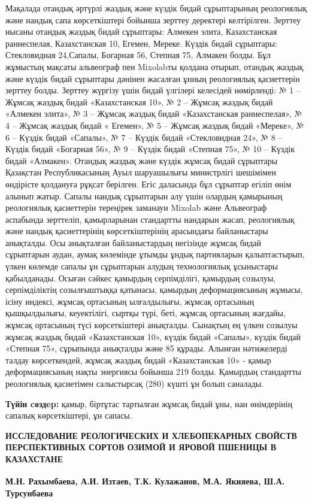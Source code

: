 Мақалада отандық әртүрлі жаздық және күздік бидай сұрыптарының
реологиялық және нандық сапа көрсеткіштері бойынша зерттеу деректері
келтірілген. Зерттеу нысаны отандық жаздық бидай сұрыптары: Алмекен
элита, Казахстанская раннеспелая, Казахстанская 10, Егемен, Мереке.
Күздік бидай сұрыптары: Стекловидная 24,Сапалы, Богарная 56, Степная 75,
Алмакен болды. Бұл жұмыстың мақсаты альвеограф пен Mixolabты қолдана
отырып, отандық жаздық және күздік бидай сұрыптары дәнінен жасалған
ұнның реологиялық қасиеттерін зерттеу болды. Зерттеу жүргізу үшін бидай
үлгілері келесідей нөмірленді: № 1 -- Жұмсақ жаздық бидай «Казахстанская
10», № 2 -- Жұмсақ жаздық бидай «Алмекен элита», № 3 -- Жұмсақ жаздық
бидай «Казахстанская раннеспелая», № 4 -- Жұмсақ жаздық бидай « Егемен»,
№ 5 -- Жұмсақ жаздық бидай «Мереке», № 6 -- Күздік бидай «Сапалы», № 7
-- Күздік бидай «Стекловидная 24», № 8 -- Күздік бидай «Богарная 56», №
9 -- Күздік бидай «Степная 75», № 10 -- Күздік бидай «Алмакен». Отандық
жаздық және күздік жұмсақ бидай сұрыптары Қазақстан Республикасының Ауыл
шаруашылығы министрлігі шешімімен өндірісте қолдануға рұқсат берілген.
Егіс даласында бұл сұрыптар егіліп өнім алынып жатыр. Сапалы нандық
сұрыптарын алу үшін олардың қамырының реологиялық қасиеттерін тереңірек
заманауи Mixolab және Альвеограф аспабында зерттеліп, қамырларынан
стандартты нандарын жасап, реологиялық және нандық қасиеттерінің
көрсеткіштерінің арасындағы байланыстары анықталды. Осы анықталған
байланыстардың негізінде жұмсақ бидай сұрыптарын аудан, аумақ көлемінде
ұтымды ұндық партияларын қалыптастырып, үлкен көлемде сапалы ұн
сұрыптарын алудың технологиялық ұсыныстары қабылданады. Осыған сәйкес
қамырдың серпімділігі, қамырдың созылуы, серпімділіктің созылғыштыққа
қатынасы, қамырдың деформациясының жұмысы, ісіну индексі, жұмсақ
ортасының ылғалдылығы, жұмсақ ортасының қышқылдылығы, кеуектілігі,
сыртқы түрі, беті, жұмсақ ортасының жағдайы, жұмсақ ортасының түсі
көрсеткіштері анықталды. Сынақтың ең үлкен созылуы жұмсақ жаздық бидай
«Казахстанская 10», күздік бидай «Сапалы», күздік бидай «Степная 75»,
сұрыпында анықталды және 85 құрады. Алынған нәтижелерді талдау
көрсеткендей, жұмсақ жаздық бидай «Казахстанская 10» - қамыр
деформациясының нақты энергиясы бойынша 219 болды. Қамырдың стандартты
реологиялық қасиетімен салыстырсақ (280) күшті ұн болып саналады.

{\bfseries Түйін cөздep:} қамыр, біртұтас тартылған жұмсақ бидай ұны, нан
өнімдерінің сапалық көрсеткіштері, ұн сапасы.

\begin{articleheader}
{\bfseries ИССЛЕДОВАНИЕ РЕОЛОГИЧЕСКИХ И ХЛЕБОПЕКАРНЫХ СВОЙСТВ ПЕРСПЕКТИВНЫХ СОРТОВ ОЗИМОЙ И ЯРОВОЙ ПШЕНИЦЫ В КАЗАХСТАНЕ}

{\bfseries
М.Н. Рахымбаева,
А.И. Изтаев,
Т.К. Кулажанов,
М.А. Якияева\textsuperscript{\envelope },
Ш.А. Турсунбаева}
\end{articleheader}

